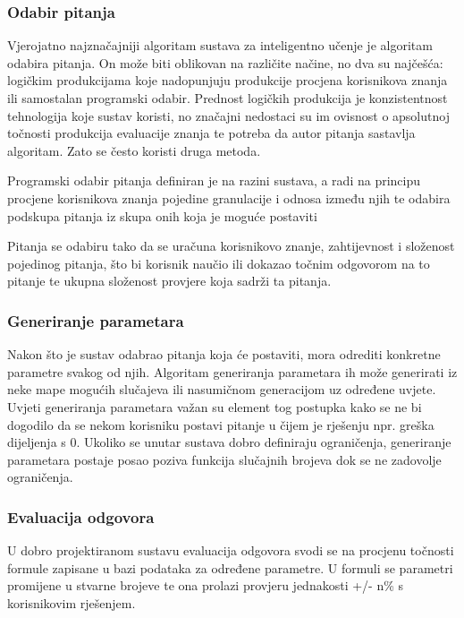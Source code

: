 \documentclass[times, utf8, zavrsni]{fer}
\begin{document}
\subsubsection{Odabir pitanja}
Vjerojatno najznačajniji algoritam sustava za inteligentno učenje je algoritam odabira pitanja. On može biti oblikovan na različite načine, no dva su najčešća: logičkim produkcijama koje nadopunjuju produkcije procjena korisnikova znanja ili samostalan programski odabir. Prednost logičkih produkcija je konzistentnost tehnologija koje sustav koristi, no značajni nedostaci su im ovisnost o apsolutnoj točnosti produkcija evaluacije znanja te potreba da autor pitanja sastavlja algoritam. Zato se često koristi druga metoda.
\par
Programski odabir pitanja definiran je na razini sustava, a radi na principu procjene korisnikova znanja pojedine granulacije i odnosa između njih te odabira podskupa pitanja iz skupa onih koja je moguće postaviti
\par
Pitanja se odabiru tako da se uračuna korisnikovo znanje, zahtijevnost i složenost pojedinog pitanja, što bi korisnik naučio ili dokazao točnim odgovorom na to pitanje te ukupna složenost provjere koja sadrži ta pitanja.

\subsubsection{Generiranje parametara}
Nakon što je sustav odabrao pitanja koja će postaviti, mora odrediti konkretne parametre svakog od njih. Algoritam generiranja parametara ih može generirati iz neke mape mogućih slučajeva ili nasumičnom generacijom uz određene uvjete. Uvjeti generiranja parametara važan su element tog postupka kako se ne bi dogodilo da se nekom korisniku postavi pitanje u čijem je rješenju npr. greška dijeljenja s 0. Ukoliko se unutar sustava dobro definiraju ograničenja, generiranje parametara postaje posao poziva funkcija slučajnih brojeva dok se ne zadovolje ograničenja.

\subsubsection{Evaluacija odgovora}
U dobro projektiranom sustavu evaluacija odgovora svodi se na procjenu točnosti formule zapisane u bazi podataka za određene parametre. U formuli se parametri promijene u stvarne brojeve te ona prolazi provjeru jednakosti +/- n\% s korisnikovim rješenjem.
\end{document}
